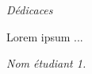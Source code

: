 \begin{center}
\Huge{\emph{Dédicaces}}
\end{center}

\vspace{1cm}

Lorem ipsum ...

\vspace{3cm}
\begin{flushright}
	\textit{Nom étudiant 1.}
\end{flushright}